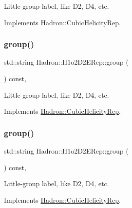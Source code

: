Little-\/group label, like D2, D4, etc. 

Implements \mbox{\hyperlink{structHadron_1_1CubicHelicityRep_a101a7d76cd8ccdad0f272db44b766113}{Hadron\+::\+Cubic\+Helicity\+Rep}}.

\mbox{\label{structHadron_1_1H1o2D2ERep_a932070dfad7ef632122da818917b4fcc}} 
\subsubsection{\texorpdfstring{group()}{group()}\hspace{0.1cm}{\footnotesize\ttfamily [3/5]}}
{\footnotesize\ttfamily std\+::string Hadron\+::\+H1o2\+D2\+E\+Rep\+::group (\begin{DoxyParamCaption}{ }\end{DoxyParamCaption}) const\hspace{0.3cm}{\ttfamily [inline]}, {\ttfamily [virtual]}}

Little-\/group label, like D2, D4, etc. 

Implements \mbox{\hyperlink{structHadron_1_1CubicHelicityRep_a101a7d76cd8ccdad0f272db44b766113}{Hadron\+::\+Cubic\+Helicity\+Rep}}.

\mbox{\label{structHadron_1_1H1o2D2ERep_a932070dfad7ef632122da818917b4fcc}} 
\subsubsection{\texorpdfstring{group()}{group()}\hspace{0.1cm}{\footnotesize\ttfamily [4/5]}}
{\footnotesize\ttfamily std\+::string Hadron\+::\+H1o2\+D2\+E\+Rep\+::group (\begin{DoxyParamCaption}{ }\end{DoxyParamCaption}) const\hspace{0.3cm}{\ttfamily [inline]}, {\ttfamily [virtual]}}

Little-\/group label, like D2, D4, etc. 

Implements \mbox{\hyperlink{structHadron_1_1CubicHelicityRep_a101a7d76cd8ccdad0f272db44b766113}{Hadron\+::\+Cubic\+Helicity\+Rep}}.

